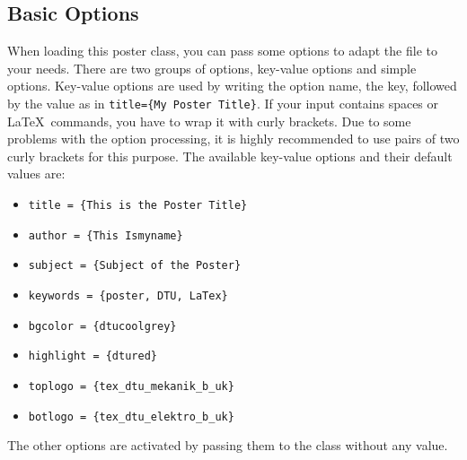 \documentclass[
]{dtuposter}
\begin{document}
%
%
\begin{dtuposterhead} %
\end{dtuposterhead}
%
%
\begin{dtupostercontent}
\section{Basic Options}
When loading this poster class, you can pass some options to adapt the 
file to your needs. There are two groups of options, key-value options 
and simple options. Key-value options are used by writing the option 
name, the key, followed by the value as in \texttt{title=\{My Poster 
Title\}}. If your input contains spaces or \LaTeX\ commands, you have to
wrap it with curly brackets. Due to some problems with the option 
processing, it is highly recommended to use pairs of two curly brackets
for this purpose. The available key-value options and their 
default values are:
\begin{itemize}
\item \texttt{title = \{This is the Poster Title\}}
\item \texttt{author = \{This Ismyname\}}
\item \texttt{subject = \{Subject of the Poster\}}
\item \texttt{keywords = \{poster, DTU, LaTex\}}
\item \texttt{bgcolor = \{dtucoolgrey\}}
\item \texttt{highlight = \{dtured\}}
\item \texttt{toplogo = \{tex\_dtu\_mekanik\_b\_uk\}}
\item \texttt{botlogo = \{tex\_dtu\_elektro\_b\_uk\}}
\end{itemize}
The other options are activated by passing them to the class without any value.


\end{dtupostercontent}
\end{document}
